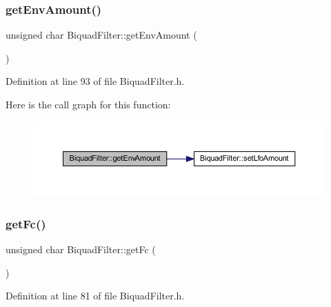 \subsubsection{\texorpdfstring{get\+Env\+Amount()}{getEnvAmount()}}
{\footnotesize\ttfamily unsigned char Biquad\+Filter\+::get\+Env\+Amount (\begin{DoxyParamCaption}{ }\end{DoxyParamCaption})\hspace{0.3cm}{\ttfamily [inline]}}



Definition at line 93 of file Biquad\+Filter.\+h.

Here is the call graph for this function\+:
\nopagebreak
\begin{figure}[H]
\begin{center}
\leavevmode
\includegraphics[width=350pt]{d9/d6f/class_biquad_filter_a00fd6c36ca50169705ad5c00560341d9_cgraph}
\end{center}
\end{figure}
\mbox{\label{class_biquad_filter_ada8a6004b4a56843483e56c0697a5531}} 
\subsubsection{\texorpdfstring{get\+Fc()}{getFc()}}
{\footnotesize\ttfamily unsigned char Biquad\+Filter\+::get\+Fc (\begin{DoxyParamCaption}{ }\end{DoxyParamCaption})\hspace{0.3cm}{\ttfamily [inline]}}



Definition at line 81 of file Biquad\+Filter.\+h.

\mbox{\label{class_biquad_filter_ab2e914c95e8d312bbc47a476f5d71945}} 
